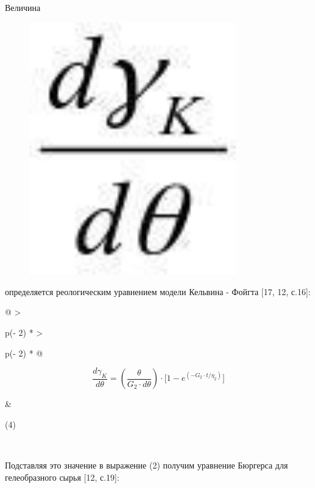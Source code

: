 Величина \begin{figure}[H]
	\centering
	\includegraphics[width=0.8\textwidth]{assets/321}
	\caption*{}
\end{figure} определяется реологическим
уравнением модели Кельвина - Фойгта {[}17, 12, с.16{]}:

\begin{longtable}[]{@{}
  >{\raggedright\arraybackslash}p{(\columnwidth - 2\tabcolsep) * }
  >{\raggedright\arraybackslash}p{(\columnwidth - 2\tabcolsep) * }@{}}
\toprule\noalign{}
\begin{minipage}[b]{\linewidth}\raggedright
\[\frac{d\gamma_{K}}{d\theta} = \left( \frac{\theta}{G_{2} \cdot d\theta} \right) \cdot \lbrack 1 - e^{( - G_{2} \cdot t/\eta_{2})}\rbrack\]
\end{minipage} & \begin{minipage}[b]{\linewidth}\raggedright
(4)
\end{minipage} \\
\midrule\noalign{}
\endhead
\bottomrule\noalign{}
\endlastfoot
\end{longtable}

Подставляя это значение в выражение (2) получим уравнение Бюргерса для
гелеобразного сырья {[}12, с.19{]}:

